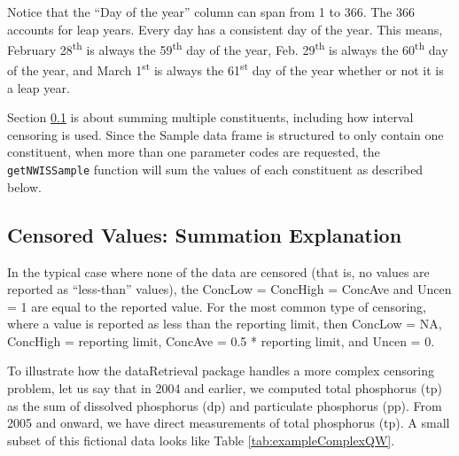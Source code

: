 \documentclass[a4paper,11pt]{article}\usepackage[]{graphicx}\usepackage[]{color}
\begin{document}
Notice that the \enquote{Day of the year} column can span from 1 to 366. The 366 accounts for leap years. Every day has a consistent day of the year. This means, February 28\textsuperscript{th} is always the 59\textsuperscript{th} day of the year, Feb. 29\textsuperscript{th} is always the 60\textsuperscript{th} day of the year, and March 1\textsuperscript{st} is always the 61\textsuperscript{st} day of the year whether or not it is a leap year.

Section \ref{sec:cenValues} is about summing multiple constituents, including how interval censoring is used. Since the Sample data frame is structured to only contain one constituent, when more than one parameter codes are requested, the \texttt{getNWISSample} function will sum the values of each constituent as described below.

\FloatBarrier


\subsection{Censored Values: Summation Explanation}
\label{sec:cenValues}
In the typical case where none of the data are censored (that is, no values are reported as \enquote{less-than} values), the ConcLow = ConcHigh = ConcAve and Uncen = 1 are equal to the reported value.  For the most common type of censoring, where a value is reported as less than the reporting limit, then ConcLow = NA, ConcHigh = reporting limit, ConcAve = 0.5 * reporting limit, and Uncen = 0.

To illustrate how the dataRetrieval package handles a more complex censoring problem, let us say that in 2004 and earlier, we computed total phosphorus (tp) as the sum of dissolved phosphorus (dp) and particulate phosphorus (pp). From 2005 and onward, we have direct measurements of total phosphorus (tp). A small subset of this fictional data looks like Table \ref{tab:exampleComplexQW}.
\end{document}
